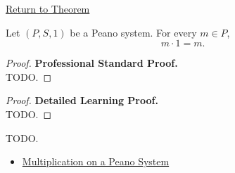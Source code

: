 \newpage
{}
\label{prf:multiplication-with-one}

\begin{remark*}[Return]
\hyperref[thm:multiplication-with-one]{Return to Theorem}
\end{remark*}

\begin{theorem*}
Let $(P,S,1)$ be a Peano system. For every $m \in P$,
\[
m \cdot 1 = m.
\]
\end{theorem*}

\begin{proof}
\textbf{Professional Standard Proof.}~\\
TODO.
\end{proof}

\begin{proof}
\textbf{Detailed Learning Proof.}~\\
TODO.
\end{proof}

\begin{remark*}
TODO.
\end{remark*}

\begin{dependencies}
\begin{itemize}
  \item \hyperref[def:multiplication-on-peano-system]{Multiplication on a Peano System}
\end{itemize}
\end{dependencies}
